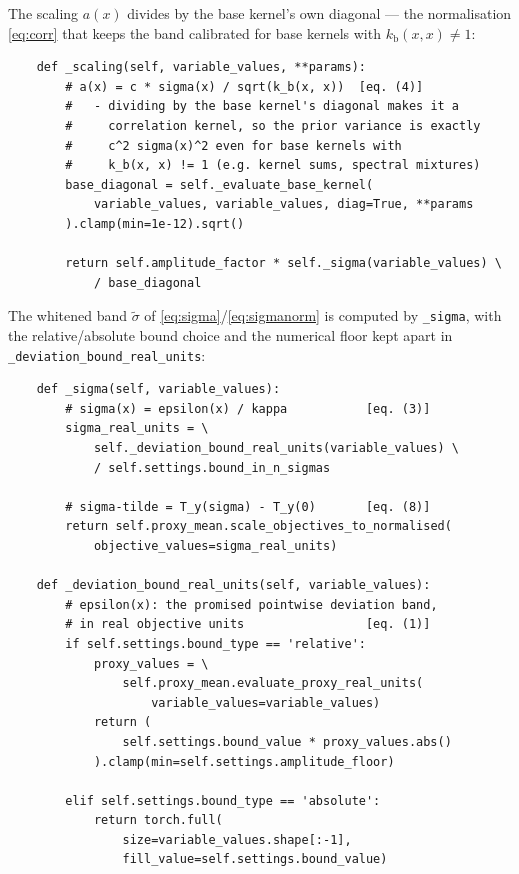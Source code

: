 \documentclass[11pt,a4paper]{article}
\newcommand{\code}[1]{\texttt{#1}}
\begin{document}
The scaling $a(x)$ divides by the base kernel's own diagonal --- the
normalisation \eqref{eq:corr} that keeps the band calibrated for base kernels
with $k_{\mathrm{b}}(x,x) \neq 1$:

\begin{lstlisting}
    def _scaling(self, variable_values, **params):
        # a(x) = c * sigma(x) / sqrt(k_b(x, x))  [eq. (4)]
        #   - dividing by the base kernel's diagonal makes it a
        #     correlation kernel, so the prior variance is exactly
        #     c^2 sigma(x)^2 even for base kernels with
        #     k_b(x, x) != 1 (e.g. kernel sums, spectral mixtures)
        base_diagonal = self._evaluate_base_kernel(
            variable_values, variable_values, diag=True, **params
        ).clamp(min=1e-12).sqrt()

        return self.amplitude_factor * self._sigma(variable_values) \
            / base_diagonal
\end{lstlisting}

The whitened band $\tilde\sigma$ of \eqref{eq:sigma}/\eqref{eq:sigmanorm} is
computed by \code{\_sigma}, with the relative/absolute bound choice and the
numerical floor kept apart in \code{\_deviation\_bound\_real\_units}:

\begin{lstlisting}
    def _sigma(self, variable_values):
        # sigma(x) = epsilon(x) / kappa           [eq. (3)]
        sigma_real_units = \
            self._deviation_bound_real_units(variable_values) \
            / self.settings.bound_in_n_sigmas

        # sigma-tilde = T_y(sigma) - T_y(0)       [eq. (8)]
        return self.proxy_mean.scale_objectives_to_normalised(
            objective_values=sigma_real_units)

    def _deviation_bound_real_units(self, variable_values):
        # epsilon(x): the promised pointwise deviation band,
        # in real objective units                 [eq. (1)]
        if self.settings.bound_type == 'relative':
            proxy_values = \
                self.proxy_mean.evaluate_proxy_real_units(
                    variable_values=variable_values)
            return (
                self.settings.bound_value * proxy_values.abs()
            ).clamp(min=self.settings.amplitude_floor)

        elif self.settings.bound_type == 'absolute':
            return torch.full(
                size=variable_values.shape[:-1],
                fill_value=self.settings.bound_value)
\end{lstlisting}
\end{document}
